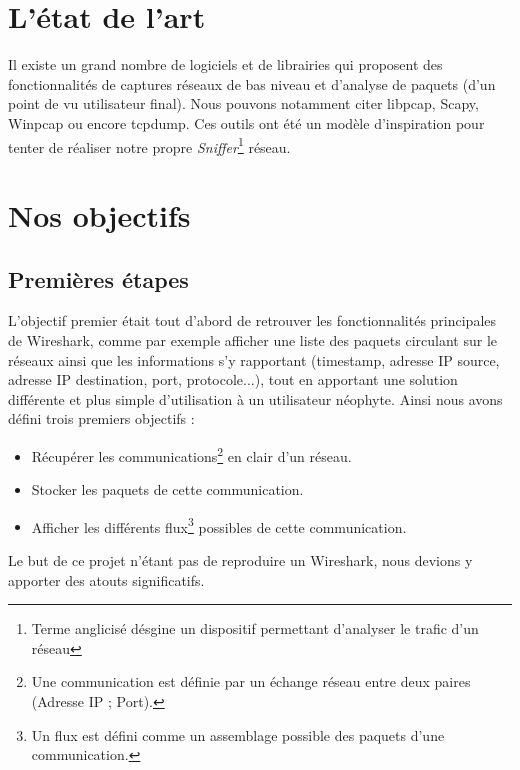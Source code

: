 

\section{L'état de l'art}
Il existe un grand nombre de logiciels et de librairies qui proposent des fonctionnalités de captures réseaux de bas niveau et d'analyse de paquets (d'un point de vu utilisateur final). 
Nous pouvons notamment citer libpcap, Scapy, Winpcap ou encore tcpdump. Ces outils ont été un modèle d'inspiration pour tenter de réaliser notre propre \textit{Sniffer}\footnote{Terme anglicisé désgine un dispositif permettant d'analyser le trafic d'un réseau} réseau.

\section{Nos objectifs}
\subsection{Premières étapes}
L'objectif premier était tout d'abord de retrouver les fonctionnalités principales de Wireshark, comme par exemple afficher une liste des paquets circulant sur le réseaux ainsi que les informations s'y rapportant (timestamp, adresse IP source, adresse IP destination, port, protocole...), tout en apportant une solution différente et plus simple d'utilisation à un utilisateur néophyte. Ainsi nous avons défini trois premiers objectifs :\\
\begin{itemize}
\item Récupérer les communications\footnote{Une communication est définie par un échange réseau entre deux paires (Adresse IP ; Port).} en clair d'un réseau.
\item Stocker les paquets de cette communication.
\item Afficher les différents flux\footnote{Un flux est défini comme un assemblage possible des paquets d'une communication.} possibles de cette communication.
\end{itemize}

Le but de ce projet n'étant pas de reproduire un Wireshark, nous devions y apporter des atouts significatifs.

